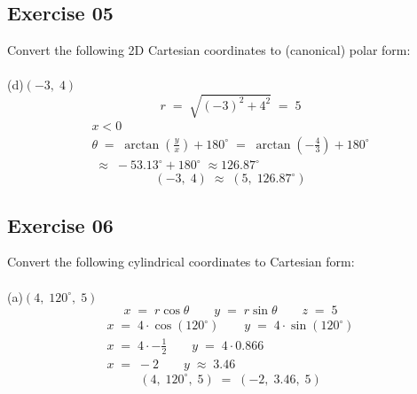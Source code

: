 \documentclass[12pt, a4paper]{article}
\begin{document}
\subsection*{Exercise 05}
Convert the following 2D Cartesian coordinates to
(canonical) polar form:\\\\
	(d)\quad$(-3,\;4)$
		\begin{equation}
			\tag*{}
				r\;=\;\sqrt{(-3)^2+4^2}\;=\;5
		\end{equation}
		\begin{gather}
			\tag*{}
				x < 0\\
			\tag*{}
				\theta\;=\;
				\arctan\left(\frac{y}{x}\right)+180^\circ\;=\;
				\arctan\left(-\frac{4}{3}\right)+180^\circ\\
			\tag*{}
				\;\approx\;-53.13^\circ+180^\circ
				\;\approx126.87^\circ
		\end{gather}
		\begin{equation}
			\tag*{}
				(-3,\;4)\;\approx\;(5,\;126.87^\circ)
		\end{equation}
		
\newpage\quad
\subsection*{Exercise 06}
Convert the following cylindrical coordinates to
Cartesian form:\\\\
	(a)\quad$(4,\;120^\circ,\;5)$
		\begin{equation}
			\tag*{}
				x\;=\;r\cos\theta\qquad y\;=\;
				r\sin\theta\qquad z\;=\;5
		\end{equation}
		\begin{gather}
			\tag*{}
				x\;=\;4\cdot\cos(120^\circ)\qquad
				y\;=\;4\cdot\sin(120^\circ)\\
			\tag*{}
				x\;=\;4\cdot-\frac{1}{2}\qquad
				y\;=\;4\cdot0.866\\
			\tag*{}
				x\;=\;-2 \qquad y\;\approx\;3.46
		\end{gather}
		\begin{equation}
			\tag*{}
				(4,\;120^\circ,\;5)\;=\;(-2,\;3.46,\;5)
		\end{equation}
	
\end{document}
